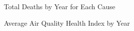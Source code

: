 \documentclass[
  letterpaper,
  DIV=11,
  numbers=noendperiod]{scrartcl}
\begin{document}
\begin{figure}


\caption{\label{fig-cause}Total Deaths by Year for Each Cause}

\end{figure}%

\begin{figure}


\caption{\label{fig-average\_air}Average Air Quality Health Index by
Year}

\end{figure}%
\end{document}
